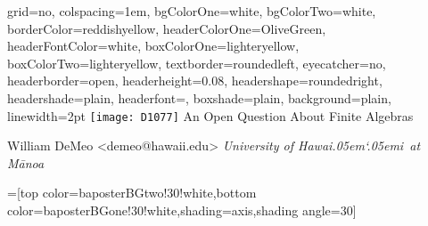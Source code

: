 \documentclass[portrait,final,a0paper]{baposter}
\newcommand{\Hawaii}{Hawai\kern.05em`\kern.05em\relax i}
\newcommand{\Manoa}{M\=anoa}
\newcommand{\<}{\ensuremath{\langle}}
\renewcommand{\>}{\ensuremath{\rangle}}
\begin{document}
\newlength{\leftimgwidth}
\begin{poster}%
  {
  grid=no,
  colspacing=1em,
  bgColorOne=white,
  bgColorTwo=white,
 borderColor=reddishyellow,
  headerColorOne=OliveGreen,
  headerFontColor=white,
  boxColorOne=lighteryellow,
  boxColorTwo=lighteryellow,
  textborder=roundedleft,
  eyecatcher=no,
  headerborder=open,
  headerheight=0.08\textheight,
  headershape=roundedright,
  headershade=plain,
  headerfont=\Large\textsf, %
  boxshade=plain,
  background=plain,
  linewidth=2pt
  }
  {\texttt{[image: D1077]}} %
  {\sf %
  An Open Question About Finite Algebras
    \vspace{.3em}}
  {\sf %
    William DeMeo
    \vspace{1em} {\small \mbox{<}demeo@hawaii.edu\mbox{>}}
\hfill
 {\it University of \Hawaii\ at \Manoa}

  }
  {%
  }

  =[top color=baposterBGtwo!30!white,bottom color=baposterBGone!30!white,shading=axis,shading angle=30]


\end{poster}
\end{document}
